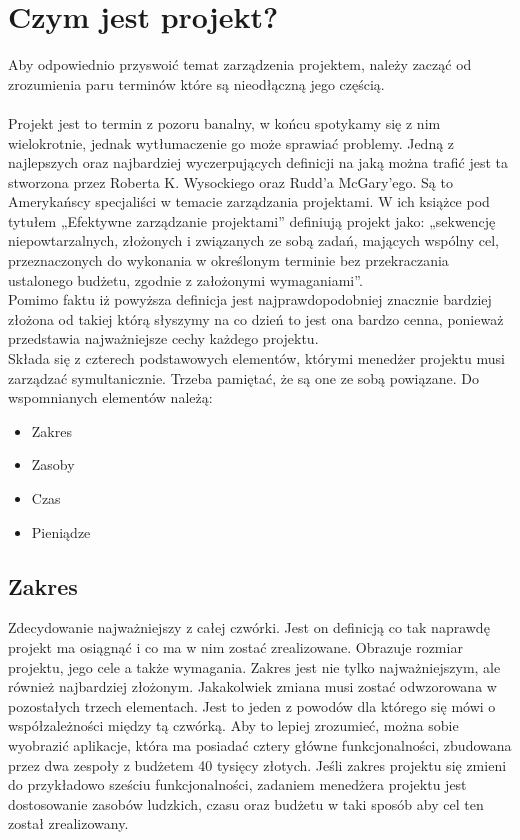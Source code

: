 \documentclass[oneside,polski,logo]{amuthesis}
\begin{document}
\section{Czym jest projekt?}
Aby odpowiednio przyswoić temat zarządzenia projektem, należy zacząć od zrozumienia paru terminów  które są nieodłączną jego częścią. \\ \\
Projekt jest to termin z pozoru banalny, w końcu spotykamy się z nim wielokrotnie, jednak wytłumaczenie go może sprawiać problemy. Jedną z najlepszych oraz najbardziej wyczerpujących definicji na jaką można trafić jest ta stworzona przez Roberta K. Wysockiego oraz Rudd’a McGary'ego. Są to Amerykańscy specjaliści w temacie zarządzania projektami. W ich książce pod tytułem „Efektywne zarządzanie projektami” definiują projekt jako: „sekwencję niepowtarzalnych, złożonych i związanych ze sobą zadań, mających wspólny cel, przeznaczonych do wykonania w określonym terminie bez przekraczania ustalonego budżetu, zgodnie z założonymi wymaganiami”. \cite{projekt} \\

Pomimo faktu iż powyższa definicja jest najprawdopodobniej znacznie bardziej złożona od takiej którą słyszymy na co dzień to jest ona bardzo cenna, ponieważ przedstawia najważniejsze cechy każdego projektu.\\

Składa się z czterech podstawowych elementów, którymi menedżer projektu musi zarządzać symultanicznie. Trzeba pamiętać, że są one ze sobą powiązane. Do wspomnianych elementów należą: 
\begin{itemize}
	\item Zakres
	\item Zasoby
	\item Czas
	\item Pieniądze
\end{itemize}

\subsection {Zakres}
Zdecydowanie najważniejszy z całej czwórki. Jest on definicją co tak naprawdę projekt ma osiągnąć i co ma w nim zostać zrealizowane. Obrazuje rozmiar projektu, jego cele a także wymagania. Zakres jest nie tylko najważniejszym, ale również najbardziej złożonym. Jakakolwiek zmiana musi zostać odwzorowana w pozostałych trzech elementach. Jest to jeden z powodów dla którego się mówi o współzależności między tą czwórką. Aby to lepiej zrozumieć, można sobie wyobrazić aplikacje, która ma posiadać cztery główne funkcjonalności, zbudowana przez dwa zespoły z budżetem 40 tysięcy złotych. Jeśli zakres projektu się zmieni do przykładowo sześciu funkcjonalności, zadaniem menedżera projektu jest dostosowanie zasobów ludzkich, czasu oraz budżetu w taki sposób aby cel ten został zrealizowany. \cite{zarzadzanie8}
\end{document}

